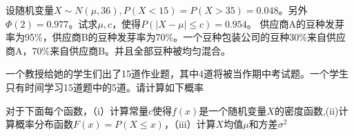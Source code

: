 \documentclass[11pt,addpoints,landscape]{exam}
\begin{document}
	\begin{multicols}{2}
		
		\begin{questions} %
			\question[8]
			设随机变量$X\sim N(\mu, 36), P(X < 15) = P(X > 35) = 0.048$。另外$\Phi(2) = 0.977$。试求$\mu, c$，使得$P(|X - \mu| \leq c) = 0.954$。
			\vspace{4cm}
			\question
			供应商A的豆种发芽率为95\%，供应商B的豆种发芽率为70\%。一个豆种包装公司的豆种30\%来自供应商A，70\%来自供应商B。并且全部豆种被均匀混合。
			
			\question
			一个教授给她的学生们出了15道作业题，其中4道将被当作期中考试题。一个学生只有时间学习15道题中的5道。请计算如下概率
			\question
			对于下面每个函数，（i）计算常量$c$使得$f(x)$是一个随机变量$X$的密度函数,(ii)计算概率分布函数$F(x) = P(X \leq x)$，（iii）计算$X$均值$\mu$和方差$\sigma ^ 2$
\end{questions}
\end{multicols}
\end{document}
